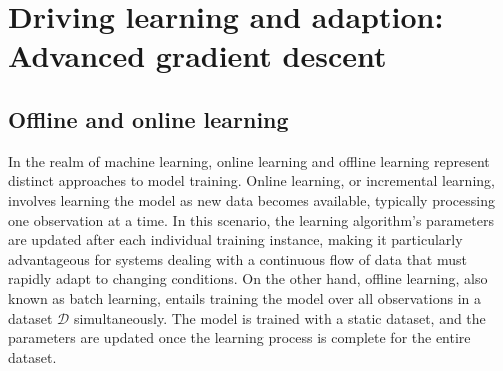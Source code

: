 
\section{Driving learning and adaption: Advanced gradient descent}

\subsection{Offline and online learning}
In the realm of machine learning, online learning and offline learning represent distinct approaches to model training. Online learning, or incremental learning, involves learning the model as new data becomes available, typically processing one observation at a time. In this scenario, the learning algorithm's parameters are updated after each individual training instance, making it particularly advantageous for systems dealing with a continuous flow of data that must rapidly adapt to changing conditions. On the other hand, offline learning, also known as batch learning, entails training the model over all observations in a dataset $\mathcal{D}$ simultaneously. The model is trained with a static dataset, and the parameters are updated once the learning process is complete for the entire dataset. %

